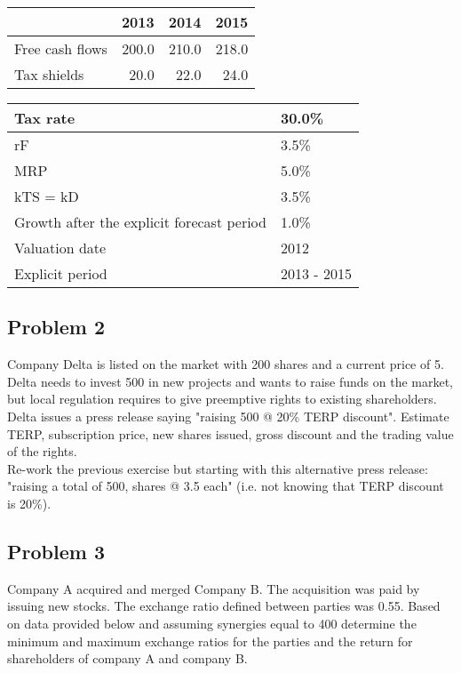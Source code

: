 \documentclass[11pt]{article}
\begin{document}
\begin{center}
\begin{tabular}{lrrr}
 & 2013 & 2014 & 2015\\
\hline
Free cash flows & 200.0 & 210.0 & 218.0\\
Tax shields & 20.0 & 22.0 & 24.0\\
\end{tabular}
\end{center}


\begin{center}
\begin{tabular}{ll}
Tax rate & 30.0\%\\
\hline
rF & 3.5\%\\
MRP & 5.0\%\\
kTS = kD & 3.5\%\\
Growth after the explicit forecast period & 1.0\%\\
Valuation date & 2012\\
Explicit period & 2013 - 2015\\
\end{tabular}
\end{center}

\subsection*{Problem 2}
\label{sec:org5981bb6}
Company Delta is listed on the market with 200 shares and a current price of 5. Delta needs to invest 500 in new projects and wants to raise funds on the market, but local regulation requires to give preemptive rights to existing shareholders. Delta issues a press release saying "raising 500 @ 20\% TERP discount". Estimate TERP, subscription price, new shares issued, gross discount and the trading value of the rights.\\
Re-work the previous exercise but starting with this alternative press release: "raising a total of 500, shares @ 3.5 each" (i.e. not knowing that TERP discount is 20\%).\\

\subsection*{Problem 3}
\label{sec:org23421ad}
Company A acquired and merged Company B. The acquisition was paid by issuing new stocks. The exchange ratio defined between parties was 0.55. Based on data provided below and assuming synergies equal to 400 determine the minimum and maximum exchange ratios for the parties and the return for shareholders of company A and company B.\\
\end{document}
